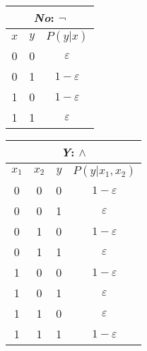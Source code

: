 \begin{center}
  \begin{tabular}{cc|c} \hline
   \multicolumn{3}{c}{\emph{No}: $\lnot$} \\ \hline
   $x$ & $y$ & $P(y|x)$ \\ \hline
   0 & 0 & $\varepsilon$ \\
   0 & 1 & $1 - \varepsilon$ \\
   1 & 0 & $1 - \varepsilon$ \\
   1 & 1 & $\varepsilon$ \\ \hline
  \end{tabular}
  \hspace*{1cm}%
  \begin{tabular}{ccc|c} \hline
   \multicolumn{4}{c}{\emph{Y}: $\land$} \\ \hline
   $x_1$ & $x_2$ & $y$ & $P(y|x_1,x_2)$ \\ \hline
   0 & 0 & 0 & $1 - \varepsilon$ \\
   0 & 0 & 1 & $\varepsilon$ \\
   0 & 1 & 0 & $1 - \varepsilon$ \\
   0 & 1 & 1 & $\varepsilon$ \\
   1 & 0 & 0 & $1 - \varepsilon$ \\
   1 & 0 & 1 & $\varepsilon$ \\
   1 & 1 & 0 & $\varepsilon$ \\
   1 & 1 & 1 & $1 - \varepsilon$ \\ \hline
  \end{tabular}
\end{center}
